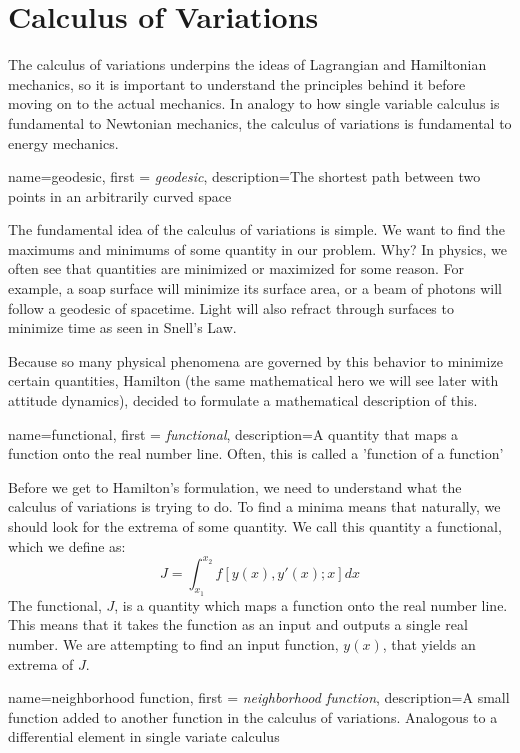 \documentclass[12pt]{report}
\begin{document}
\section{Calculus of Variations}

The calculus of variations underpins the ideas of \gls{Lagrangian} and Hamiltonian mechanics, so it is important to understand the principles behind it before moving on to the actual mechanics. In analogy to how single variable calculus is fundamental to Newtonian mechanics, the calculus of variations is fundamental to energy mechanics.

{
    name=geodesic,
    first = {\textit{geodesic}},
    description={The shortest path between two points in an arbitrarily curved space}
}

The fundamental idea of the calculus of variations is simple. We want to find the maximums and minimums of some quantity in our problem. Why? In physics, we often see that quantities are minimized or maximized for some reason. For example, a soap surface will minimize its surface area, or a beam of photons will follow a \gls{geodesic} of spacetime. Light will also refract through surfaces to minimize time as seen in Snell's Law. 

Because so many physical phenomena are governed by this behavior to minimize certain quantities, Hamilton (the same mathematical hero we will see later with attitude dynamics), decided to formulate a mathematical description of this.

{
    name=functional,
    first = {\textit{functional}},
    description={A quantity that maps a function onto the real number line. Often,  this is called a 'function of a function'}
}

Before we get to Hamilton's formulation, we need to understand what the calculus of variations is trying to do. To find a minima means that naturally, we should look for the extrema of some quantity. We call this quantity a \gls{functional}, which we define as:
\begin{equation}\label{eq:functional}
    J=\int_{x_1}^{x_2}f\left[y(x),y'(x);x\right]{dx}
\end{equation}
The \gls{functional}, $J$, is a quantity which maps a function onto the real number line. This means that it takes the function as an input and outputs a single real number. We are attempting to find an input function, $y(x)$, that yields an extrema of $J$. 

{
    name=neighborhood function,
    first = {\textit{neighborhood function}},
    description={A small function added to another function in the calculus of variations. Analogous to a differential element in single variate calculus}
}
\end{document}
